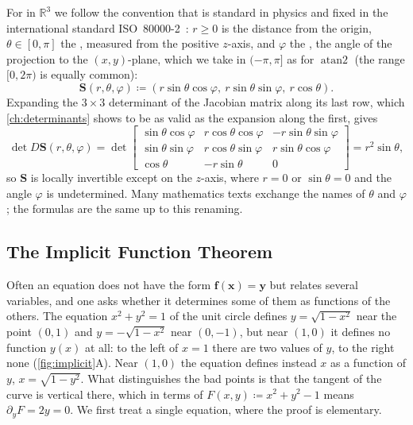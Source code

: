For  in $\mathbb R^3$ we follow the convention that is standard in physics and fixed in the international standard ISO~80000-2~\cite{iso80000-2}: $r\ge0$ is the distance from the origin, $\theta\in[0,\pi]$ the , measured from the positive $z$-axis, and $\varphi$ the , the angle of the projection to the $(x,y)$-plane, which we take in $(-\pi,\pi]$ as for $\operatorname{atan2}$ (the range $[0,2\pi)$ is equally common):
\[
\mathbf S(r,\theta,\varphi)\coloneqq(r\sin\theta\cos\varphi,\ r\sin\theta\sin\varphi,\ r\cos\theta).
\]
Expanding the $3\times3$ determinant of the Jacobian matrix along its last row, which \cref{ch:determinants} shows to be as valid as the expansion along the first, gives
\[
\det D\mathbf S(r,\theta,\varphi)=\det\begin{bmatrix}\sin\theta\cos\varphi&r\cos\theta\cos\varphi&-r\sin\theta\sin\varphi\\\sin\theta\sin\varphi&r\cos\theta\sin\varphi&r\sin\theta\cos\varphi\\\cos\theta&-r\sin\theta&0\end{bmatrix}=r^2\sin\theta ,
\]
so $\mathbf S$ is locally invertible except on the $z$-axis, where $r=0$ or $\sin\theta=0$ and the angle $\varphi$ is undetermined. Many mathematics texts exchange the names of $\theta$ and $\varphi$; the formulas are the same up to this renaming.

\subsection{The Implicit Function Theorem}

Often an equation does not have the form $\mathbf f(\mathbf x)=\mathbf y$ but relates several variables, and one asks whether it determines some of them as functions of the others. The equation $x^2+y^2=1$ of the unit circle defines $y=\sqrt{1-x^2}$ near the point $(0,1)$ and $y=-\sqrt{1-x^2}$ near $(0,-1)$, but near $(1,0)$ it defines no function $y(x)$ at all: to the left of $x=1$ there are two values of $y$, to the right none (\cref{fig:implicit}A). Near $(1,0)$ the equation defines instead $x$ as a function of $y$, $x=\sqrt{1-y^2}$. What distinguishes the bad points is that the tangent of the curve is vertical there, which in terms of $F(x,y)\coloneqq x^2+y^2-1$ means $\partial_yF=2y=0$. We first treat a single equation, where the proof is elementary.

